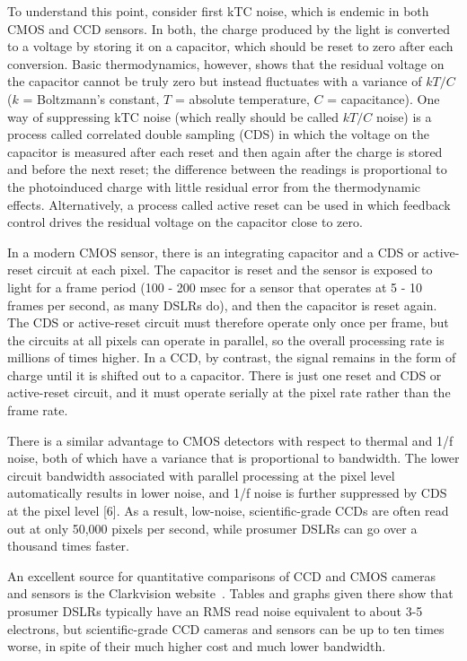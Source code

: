 To understand this point, consider first kTC noise, which is endemic in both CMOS and CCD sensors. In both, the charge produced by the light is converted to a voltage by storing it on a capacitor, which should be reset to zero after each conversion. Basic thermodynamics, however, shows that the residual voltage on the capacitor cannot be truly zero but instead fluctuates with a variance of $kT/C$ ($k$ = Boltzmann's constant, $T$ = absolute temperature, $C$ = capacitance). One way of suppressing kTC noise (which really should be called $kT/C$ noise) is a process called correlated double sampling (CDS) in which the voltage on the capacitor is measured after each reset and then again after the charge is stored and before the next reset; the difference between the readings is proportional to the photoinduced charge with little residual error from the thermodynamic effects. Alternatively, a process called active reset can be used in which feedback control drives the residual voltage on the capacitor close to zero. 

In a modern CMOS sensor, there is an integrating capacitor and a CDS or active-reset circuit at each pixel. The capacitor is reset and the sensor is exposed to light for a frame period (100 - 200 msec for a sensor that operates at 5 - 10 frames per second, as many DSLRs do), and then the capacitor is reset again. The CDS or active-reset circuit must therefore operate only once per frame, but the circuits at all pixels can operate in parallel, so the overall processing rate is millions of times higher. In a CCD, by contrast, the signal remains in the form of charge until it is shifted out to a capacitor. There is just one reset and CDS or active-reset circuit, and it must operate serially at the pixel rate rather than
the frame rate.

There is a similar advantage to CMOS detectors with respect to thermal and 1/f noise, both of which have a variance that is proportional to bandwidth. The lower circuit bandwidth associated with parallel processing at the pixel level automatically results in lower noise, and 1/f noise is further suppressed by CDS at the pixel level [6]. As a result, low-noise, scientific-grade CCDs are often read out at only 50,000 pixels per second, while prosumer DSLRs can go over a thousand times faster.

An excellent source for quantitative comparisons of CCD and CMOS cameras and sensors is the Clarkvision website~\citep{clarkvision}. Tables and graphs given there show that prosumer DSLRs typically have an RMS read noise equivalent to about 3-5 electrons, but scientific-grade CCD cameras and sensors can be up to ten times worse, in spite of their much higher cost and much lower bandwidth.

